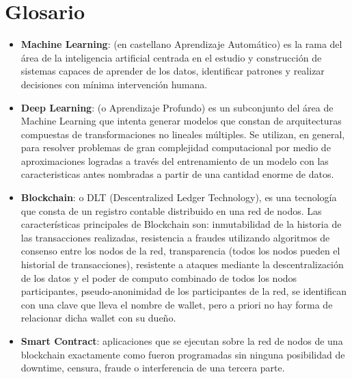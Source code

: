 \documentclass[
11pt, %
oneside, %
spanish, %
singlespacing, %
headsepline, %
chapterinoneline, %
]{MastersDoctoralThesis} %
\begin{document}

\printbibliography[heading=bibnumbered, title=Referencias]


\chapter{Glosario}
\begin{itemize}
\item \textbf{Machine Learning}: (en castellano Aprendizaje Automático) es la rama del área de la inteligencia artificial centrada en el estudio y construcción de sistemas capaces de aprender de los datos, identificar patrones y realizar decisiones con mínima intervención humana. 
\item \textbf{Deep Learning}: (o Aprendizaje Profundo) es un subconjunto del área de Machine Learning que intenta generar modelos que constan de arquitecturas compuestas de transformaciones no lineales múltiples. Se utilizan, en general, para resolver problemas de gran complejidad computacional por medio de aproximaciones logradas a través del entrenamiento de un modelo con las caracteristicas antes nombradas a partir de una cantidad enorme de datos.
\item \textbf{Blockchain}: o DLT (Descentralized Ledger Technology), es una tecnología que consta de un registro contable distribuido en una red de nodos. Las características principales de Blockchain son: inmutabilidad de la historia de las transacciones realizadas, resistencia a fraudes utilizando algoritmos de consenso entre los nodos de la red, transparencia (todos los nodos pueden el historial de transacciones), resistente a ataques mediante la descentralización de los datos y el poder de computo combinado de todos los nodos participantes, pseudo-anonimidad de los participantes de la red, se identifican con una clave que lleva el nombre de wallet, pero a  priori no hay forma de relacionar dicha wallet con su dueño.
\item \textbf{Smart Contract}: aplicaciones que se ejecutan sobre la red de nodos de una blockchain exactamente como fueron programadas sin ninguna posibilidad de downtime, censura, fraude o interferencia de una tercera parte.

\end{itemize}
\end{document}
